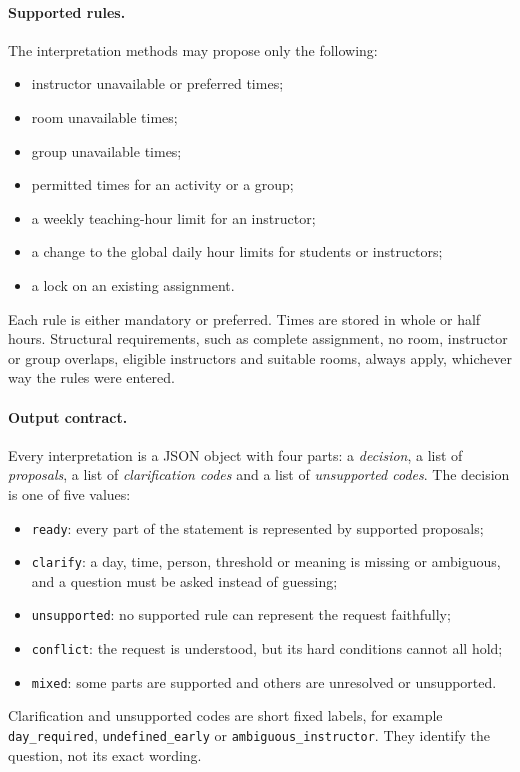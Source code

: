 \paragraph{Supported rules.} The interpretation methods may propose only the following:
\begin{itemize}
\item instructor unavailable or preferred times;
\item room unavailable times;
\item group unavailable times;
\item permitted times for an activity or a group;
\item a weekly teaching-hour limit for an instructor;
\item a change to the global daily hour limits for students or instructors;
\item a lock on an existing assignment.
\end{itemize}
Each rule is either mandatory or preferred. Times are stored in whole or half hours. Structural requirements, such as complete assignment, no room, instructor or group overlaps, eligible instructors and suitable rooms, always apply, whichever way the rules were entered.

\paragraph{Output contract.} Every interpretation is a JSON object with four parts: a \emph{decision}, a list of \emph{proposals}, a list of \emph{clarification codes} and a list of \emph{unsupported codes}. The decision is one of five values:
\begin{itemize}
\item \texttt{ready}: every part of the statement is represented by supported proposals;
\item \texttt{clarify}: a day, time, person, threshold or meaning is missing or ambiguous, and a question must be asked instead of guessing;
\item \texttt{unsupported}: no supported rule can represent the request faithfully;
\item \texttt{conflict}: the request is understood, but its hard conditions cannot all hold;
\item \texttt{mixed}: some parts are supported and others are unresolved or unsupported.
\end{itemize}
Clarification and unsupported codes are short fixed labels, for example \texttt{day\_required}, \texttt{undefined\_early} or \texttt{ambiguous\_instructor}. They identify the question, not its exact wording.

